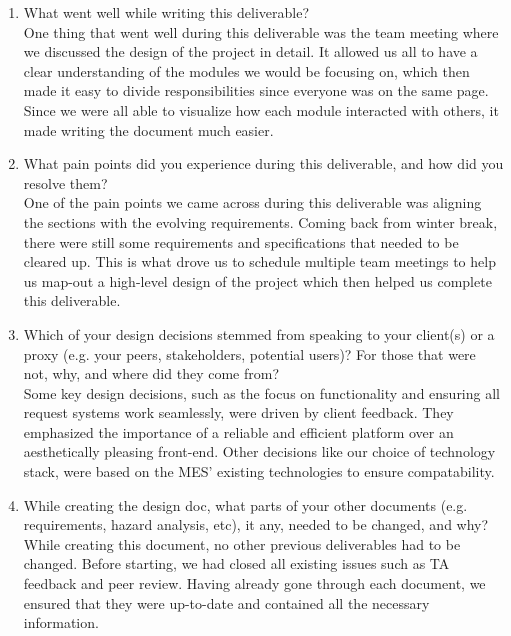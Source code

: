 \documentclass[12pt, titlepage]{article}
\begin{document}
\begin{enumerate}
  \item What went well while writing this deliverable? \\
One thing that went well during this deliverable was the team meeting where we discussed the design of the project in detail. It allowed us all to have a clear understanding of the modules we would be focusing on, which then made it easy to divide responsibilities since everyone was on the same page. Since we were all able to visualize how each module interacted with others, it made writing the document much easier. 

  \item What pain points did you experience during this deliverable, and how
    did you resolve them?\\
One of the pain points we came across during this deliverable was aligning the sections with the evolving requirements. Coming back from winter break, there were still some requirements and specifications that needed to be cleared up. This is what drove us to schedule multiple team meetings to help us map-out a high-level design of the project which then helped us complete this deliverable.

  \item Which of your design decisions stemmed from speaking to your client(s)
  or a proxy (e.g. your peers, stakeholders, potential users)? For those that
  were not, why, and where did they come from?\\
Some key design decisions, such as the focus on functionality and ensuring all request systems work seamlessly, were driven by client feedback. They emphasized the importance of a reliable and efficient platform over an aesthetically pleasing front-end. Other decisions like our choice of technology stack, were based on the MES' existing technologies to ensure compatability.

  
  \item While creating the design doc, what parts of your other documents (e.g.
  requirements, hazard analysis, etc), it any, needed to be changed, and why?\\
While creating this document, no other previous deliverables had to be changed. Before starting, we had closed all existing issues such as TA feedback and peer review. Having already gone through each document, we ensured that they were up-to-date and contained all the necessary information.
  

\end{enumerate}
\end{document}
